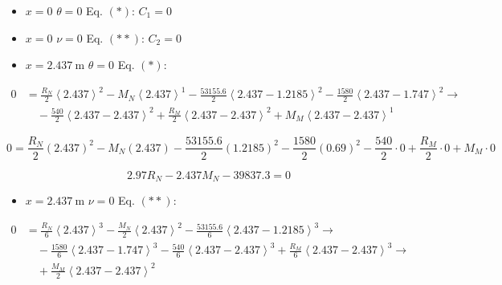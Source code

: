 \begin{itemize}
  \item $x = 0$ \hspace{1em} $\theta = 0$ \hspace{1em} Eq. $\left( * \right)$: $\boxed{C_1 = 0}$
  \item $x = 0$ \hspace{1em} $\nu = 0$ \hspace{1em} Eq. $\left( ** \right)$: $\boxed{C_2 = 0}$
  \item $x = \SI{2.437}{\meter}$ \hspace{1em} $\theta = 0$ \hspace{1em} Eq. $\left( * \right)$:
\end{itemize}

\begin{align*}
  0 & = \frac{R_N}{2} \left<\num{2.437}\right>^2 - M_N \left<\num{2.437}\right>^1 -\frac{\num{53155.6}}{2} \left<\num{2.437} - \num{1.2185}\right>^2 - \frac{\num{1580}}{2} \left<\num{2.437} - \num{1.747}\right>^2 \rightarrow \\
    & \quad - \frac{\num{540}}{2} \left<\num{2.437} - \num{2.437}\right>^2 + \frac{R_M}{2} \left<\num{2.437} - \num{2.437}\right>^2 + M_M \left<\num{2.437} - \num{2.437}\right>^1
\end{align*}

\begin{equation*}
  0 = \frac{R_N}{2} \left( \num{2.437} \right)^2 - M_N \left( \num{2.437} \right) -\frac{\num{53155.6}}{2} \left( \num{1.2185} \right)^2 - \frac{\num{1580}}{2} \left( \num{0.69} \right)^2 - \frac{\num{540}}{2} \cdot 0 + \frac{R_M}{2} \cdot 0 + M_M \cdot 0
\end{equation*}

\begin{equation}
  \num{2.97} R_N - \num{2.437} M_N - \num{39837.3} = 0
  \label{eq:cond_contorno_theta_vl2}
\end{equation}

\begin{itemize}
  \item $x = \SI{2.437}{\meter}$ \hspace{1em} $\nu = 0$ \hspace{1em} Eq. $\left( ** \right)$:
\end{itemize}

\begin{align*}
  0 & = \frac{R_N}{6} \left< \num{2.437} \right>^3 - \frac{M_N}{2} \left< \num{2.437} \right>^2 -\frac{\num{53155.6}}{6} \left< \num{2.437} - \num{1.2185} \right>^3 \rightarrow                                      \\
    & \quad - \frac{\num{1580}}{6} \left< \num{2.437} - \num{1.747} \right>^3 - \frac{\num{540}}{6} \left< \num{2.437} - \num{2.437} \right>^3 + \frac{R_M}{6} \left< \num{2.437} - \num{2.437} \right>^3 \rightarrow \\
    & \quad + \frac{M_M}{2} \left< \num{2.437} - \num{2.437} \right>^2
\end{align*}

